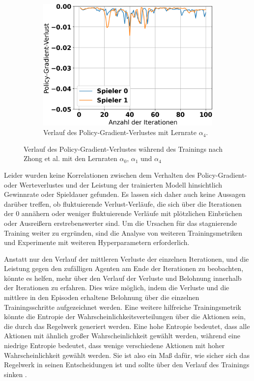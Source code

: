 \begin{figure}[ht!]
\begin{subfigure}[b]{0.32\textwidth}
		\includegraphics[width=\textwidth]{Bilder/ensemble-training/e_0_00001/graph_policy_gradient_losses.png}
		\caption{Verlauf des Policy-Gradient-Verlustes mit Lernrate $\alpha_4$.}
		\label{fig:f18}
	\end{subfigure}
	\caption{Verlauf des Policy-Gradient-Verlustes während des Trainings nach Zhong et al. mit den Lernraten $\alpha_0$, $\alpha_1$ und $\alpha_4$}
\end{figure}

Leider wurden keine Korrelationen zwischen dem Verhalten des Policy-Gradient- oder Werteverlustes und der Leistung der trainierten Modell hinsichtlich Gewinnrate oder Spieldauer gefunden. Es lassen sich daher auch keine Aussagen darüber treffen, ob fluktuierende Verlust-Verläufe, die sich über die Iterationen der 0 annähern oder weniger fluktuierende Verläufe mit plötzlichen Einbrüchen oder Ausreißern erstrebenswerter sind. Um die Ursachen für das stagnierende Training weiter zu ergründen, sind die Analyse von weiteren Trainingsmetriken und Experimente mit weiteren Hyperparametern erforderlich.

Anstatt nur den Verlauf der mittleren Verluste der einzelnen Iterationen, und die Leistung gegen den zufälligen Agenten am Ende der Iterationen zu beobachten, könnte es helfen, mehr über den Verlauf der Verluste und Belohnung innerhalb der Iterationen zu erfahren. Dies wäre möglich, indem die Verluste und die mittlere in den Episoden erhaltene Belohnung über die einzelnen Trainingsschritte aufgezeichnet werden. Eine weitere hilfreiche Trainingsmetrik könnte die Entropie der Wahrscheinlichkeitsverteilungen über die Aktionen sein, die durch das Regelwerk generiert werden. Eine hohe Entropie bedeutet, dass alle Aktionen mit ähnlich großer Wahrscheinlichkeit gewählt werden, während eine niedrige Entropie bedeutet, dass wenige verschiedene Aktionen mit hoher Wahrscheinlichkeit gewählt werden. Sie ist also ein Maß dafür, wie sicher sich das Regelwerk in seinen Entscheidungen ist und sollte über den Verlauf des Trainings sinken \cite{Lapan.2020}.

